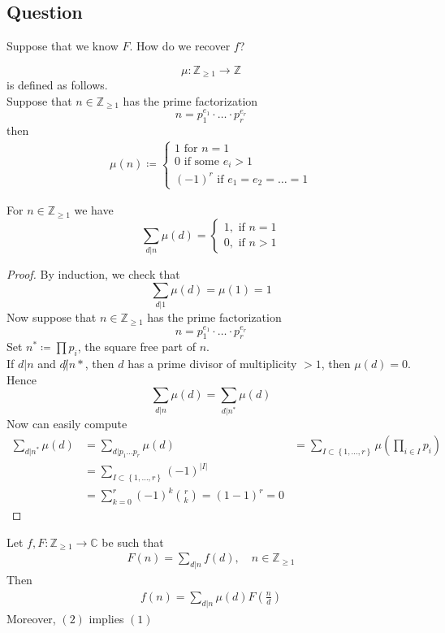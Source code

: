 \documentclass[../main.tex]{subfiles}
\begin{document}
\subsection*{Question}
Suppose that we know $F$. How do we recover $f$?
\begin{defn}
	\[ 
	\mu: \mathbb{Z}_{\geq 1} \to \mathbb{Z}
	\]
	is defined as follows.\\
	Suppose that $n \in \mathbb{Z}_{\geq 1} $ has the prime factorization
	\[ 
	n = p_1 ^{e_1}\cdot \ldots \cdot p_r ^{e_r}
	\]
	then 
	\begin{align*}
		\mu( n) \coloneqq 
		\begin{cases}
		1 \text{ for } n=1\\
		0 \text{ if some } e_i >1\\
		( -1) ^{r} \text{ if }  e_1 = e_2= \ldots = 1
		\end{cases}
	\end{align*}
	
\end{defn}
\begin{lemma}
For $n \in \mathbb{Z}_{\geq 1} $ we have
\[ 
	\sum_{d|n} \mu ( d)  = 
	\begin{cases}
	1, \text{ if }  n=1\\
	0 , \text{ if }  n >1
	\end{cases}
\]

\end{lemma}
\begin{proof}
By induction, we check that 
\[ 
	\sum_{d|1} \mu( d )  = \mu ( 1) =1
\]
Now suppose that $n \in \mathbb{Z}_{\geq 1} $ has the prime factorization
\[ 
n= p_1^{e_1 }\cdot \ldots \cdot p_r^{e_r}
\]
Set $n^{*} \coloneqq  \prod p_i$, the square free part of $n$.\\
If $d| n$ and $d\not| n*$, then $d$ has a prime divisor of multiplicity $>1$, then $\mu( d) = 0$. Hence
\[ 
	\sum_{d|n}  \mu( d) = \sum_{d| n^*} \mu( d)
\]
Now can easily compute
\begin{align*}
\sum_{d| n^{*}} \mu( d)  &= \sum_{d| p_1\ldots p_r} \mu ( d)
&= \sum_{I \subset \left\{ 1, \ldots, r \right\} } \mu ( \prod_{i \in I} p_i) \\
&= \sum_{I \subset \left\{ 1,\ldots,r \right\} } ( -1) ^{|I|}\\
&= \sum_{k=0}^{ r} ( -1) ^{k} \binom r k = ( 1-1) ^{r}= 0	
\end{align*}

\end{proof}
\begin{thm}
	Let $f,F: \mathbb{Z}_{\geq 1} \to \mathbb{C}$ be such that
	\begin{align}
		F( n) = \sum_{d|n} f( d) , \quad n \in \mathbb{Z}_{\geq 1} 
	\end{align}
	Then
	\begin{align}
		f( n) = \sum_{d|n} \mu( d) F( \frac{n}{d}) 
	\end{align}
	Moreover, $( 2) $ implies $( 1) $
\end{thm}
\end{document}
